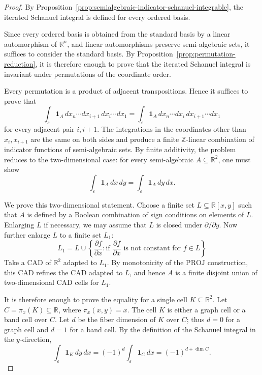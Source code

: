 \documentclass[11pt]{article}
\theoremstyle{remark}
\newcommand{\1}{\mathbf 1}
\begin{document}
\begin{proof}
By Proposition~\ref{prop:semialgebraic-indicator-schanuel-integrable},
the iterated Schanuel integral is defined for every ordered basis.

Since every ordered basis is obtained from the standard basis by a linear automorphism of $\mathbb R^n$, 
and linear automorphisms preserve semi-algebraic sets, it suffices to consider the standard basis. 
By Proposition~\ref{prop:permutation-reduction}, it is therefore enough to prove that the iterated Schanuel integral is invariant under permutations of the coordinate order.

Every permutation is a product of adjacent transpositions.  Hence it suffices
to prove that
\[
  \int_{\varepsilon} \mathbf{1}_A\,
  dx_n\cdots dx_{i+1}\,dx_i\cdots dx_1
  =
  \int_{\varepsilon} \mathbf{1}_A\,
  dx_n\cdots dx_i\,dx_{i+1}\cdots dx_1
\]
for every adjacent pair \(i,i+1\).  The integrations in the coordinates other
than \(x_i,x_{i+1}\) are the same on both sides and produce a finite
\(\mathbb{Z}\)-linear combination of indicator functions of semi-algebraic
sets.  By finite additivity, the problem reduces to the two-dimensional case:
for every semi-algebraic \(A\subseteq\mathbb{R}^2\), one must show
\[
  \int_{\varepsilon}\mathbf{1}_A\,dx\,dy
  =
  \int_{\varepsilon}\mathbf{1}_A\,dy\,dx .
\]

We prove this two-dimensional statement.  Choose a finite set
\(L\subseteq\mathbb{R}[x,y]\) such that \(A\) is defined by a Boolean
combination of sign conditions on elements of \(L\).  Enlarging \(L\) if
necessary, we may assume that \(L\) is closed under \(\partial/\partial y\).
Now further enlarge \(L\) to a finite set \(L_1\):
$$ L_1= L\cup \left\{\frac{\partial f}{\partial x}: 
\text{if }\frac{\partial f}{\partial x} \text{ is not constant for $f\in L$}\right\} $$
Take a CAD of \(\mathbb{R}^2\)
adapted to \(L_1\).  By monotonicity of the $\text{PROJ}$ construction, this CAD 
refines the CAD adapted to \(L\), and hence \(A\) is a finite disjoint union of
two-dimensional CAD cells for \(L_1\).

It is therefore enough to prove the equality for a single cell
\(K\subseteq\mathbb{R}^2\).  Let \(C=\pi_x(K)\subseteq\mathbb{R}\), where
\(\pi_x(x,y)=x\).  The cell \(K\) is either a graph cell or a band cell over
\(C\).  Let \(d\) be the fiber dimension of \(K\) over \(C\); thus \(d=0\) for a
graph cell and \(d=1\) for a band cell.  By the definition of the Schanuel
integral in the \(y\)-direction,
\[
  \int_{\varepsilon}\mathbf{1}_K\,dy\,dx
  =
  (-1)^d
  \int_{\varepsilon}\mathbf{1}_C\,dx
  =
  (-1)^{d+\dim C}.
\]


\end{proof}
\end{document}
